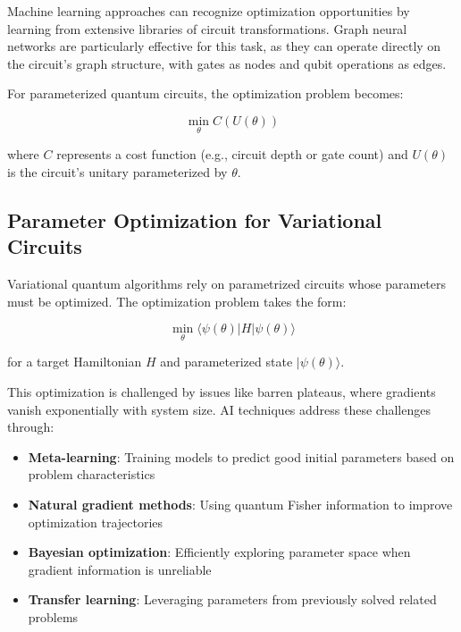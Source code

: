 Machine learning approaches can recognize optimization opportunities by learning from extensive libraries of circuit transformations. Graph neural networks are particularly effective for this task, as they can operate directly on the circuit's graph structure, with gates as nodes and qubit operations as edges.

For parameterized quantum circuits, the optimization problem becomes:

\begin{equation}
\min_{\theta} C(U(\theta))
\end{equation}

where $C$ represents a cost function (e.g., circuit depth or gate count) and $U(\theta)$ is the circuit's unitary parameterized by $\theta$.

\subsection{Parameter Optimization for Variational Circuits}
Variational quantum algorithms rely on parametrized circuits whose parameters must be optimized. The optimization problem takes the form:

\begin{equation}
\min_{\theta} \langle \psi(\theta) | H | \psi(\theta) \rangle
\end{equation}

for a target Hamiltonian $H$ and parameterized state $|\psi(\theta)\rangle$.

This optimization is challenged by issues like barren plateaus, where gradients vanish exponentially with system size. AI techniques address these challenges through:

\begin{itemize}
    \item \textbf{Meta-learning}: Training models to predict good initial parameters based on problem characteristics
    
    \item \textbf{Natural gradient methods}: Using quantum Fisher information to improve optimization trajectories
    
    \item \textbf{Bayesian optimization}: Efficiently exploring parameter space when gradient information is unreliable
    
    \item \textbf{Transfer learning}: Leveraging parameters from previously solved related problems
\end{itemize}

